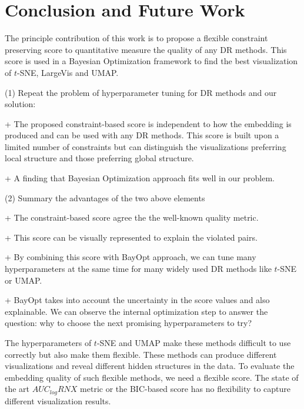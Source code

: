 \section{Conclusion and Future Work}\label{sec:conclusion}
The principle contribution of this work is to propose a flexible constraint preserving score to quantitative measure the quality of any DR methods.
This score is used in a Bayesian Optimization framework to find the best visualization of $t$-SNE, LargeVis and UMAP.


\par (1) Repeat the problem of hyperparameter tuning for DR methods and our solution:

+ The proposed constraint-based score is independent to how the embedding is produced and can be used with any DR methods.
This score is built upon a limited number of constraints but can distinguish the visualizations preferring local structure and those preferring global structure.

+ A finding that Bayesian Optimization approach fits well in our problem.


\vspace{8pt}
\par (2) Summary the advantages of the two above elements

+ The constraint-based score agree the the well-known quality metric.

+ This score can be visually represented to explain the violated pairs.

+ By combining this score with BayOpt approach, we can tune many hyperparameters at the same time for many widely used DR methods like $t$-SNE or UMAP.

+ BayOpt takes into account the uncertainty in the score values and also explainable. We can observe the internal optimization step to answer the question: why to choose the next promising hyperparameters to try?

The hyperparameters of $t$-SNE and UMAP make these methods difficult to use correctly but also make them flexible.
These methods can produce different visualizations and reveal different hidden structures in the data.
To evaluate the embedding quality of such flexible methods, we need a flexible score.
The state of the art $AUC_{log}RNX$ metric or the BIC-based score has no flexibility to capture different visualization results.

